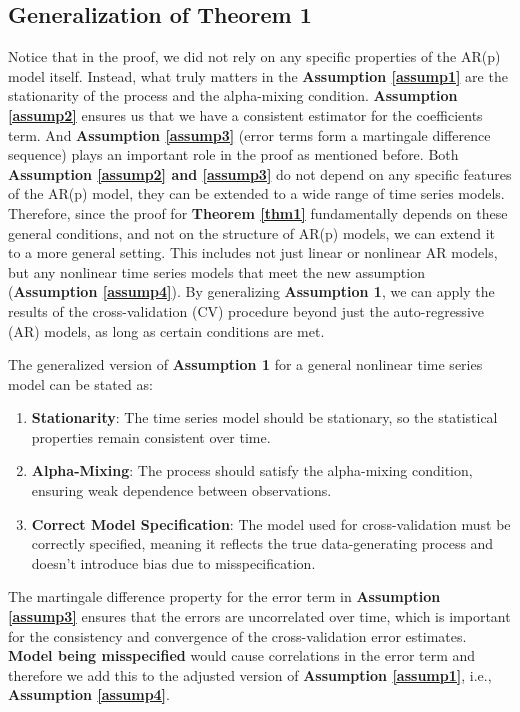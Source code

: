 \documentclass[12pt, oneside]{amsart}
\theoremstyle{definition}
\theoremstyle{remark}
\numberwithin{equation}{section}
\begin{document}
\subsection{Generalization of Theorem 1}
Notice that in the proof, we did not rely on any specific properties of the AR(p) model itself. Instead, what truly matters in the \textbf{Assumption \ref{assump1}} are the stationarity of the process and the alpha-mixing condition. \textbf{Assumption \ref{assump2}} ensures us that we have a consistent estimator for the coefficients term. And \textbf{Assumption \ref{assump3}} (error terms form a martingale difference sequence) plays an important role in the proof as mentioned before. Both \textbf{Assumption \ref{assump2} and \ref{assump3}} do not depend on any specific features of the AR(p) model, they can be extended to a wide range of time series models. \\

Therefore, since the proof for \textbf{Theorem \ref{thm1}} fundamentally depends on these general conditions, and not on the structure of AR(p) models, we can extend it to a more general setting. This includes not just linear or nonlinear AR models, but any nonlinear time series models that meet the new assumption (\textbf{Assumption \ref{assump4}}). By generalizing \textbf{Assumption 1}, we can apply the results of the cross-validation (CV) procedure beyond just the auto-regressive (AR) models, as long as certain conditions are met. 

\begin{assumption}\label{assump4}
    The generalized version of \textbf{Assumption 1} for a general nonlinear time series model can be stated as:
\begin{enumerate}
    \item \textbf{Stationarity}: The time series model should be stationary, so the statistical properties remain consistent over time.
    \item \textbf{Alpha-Mixing}: The process should satisfy the alpha-mixing condition, ensuring weak dependence between observations.
    \item \textbf{Correct Model Specification}: The model used for cross-validation must be correctly specified, meaning it reflects the true data-generating process and doesn't introduce bias due to misspecification.
\end{enumerate}
\end{assumption}
The martingale difference property for the error term in \textbf{Assumption \ref{assump3}} ensures that the errors are uncorrelated over time, which is important for the consistency and convergence of the cross-validation error estimates. \textbf{Model being misspecified} would cause correlations in the error term and therefore we add this to the adjusted version of \textbf{Assumption \ref{assump1}}, i.e., \textbf{Assumption \ref{assump4}}. \\
\end{document}
